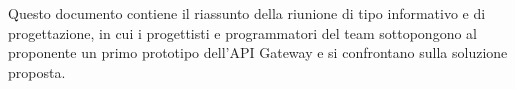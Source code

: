 Questo documento contiene il riassunto della riunione di tipo informativo e di progettazione, in cui i progettisti e programmatori del team sottopongono al proponente un primo prototipo dell'API Gateway e si confrontano sulla soluzione proposta.

